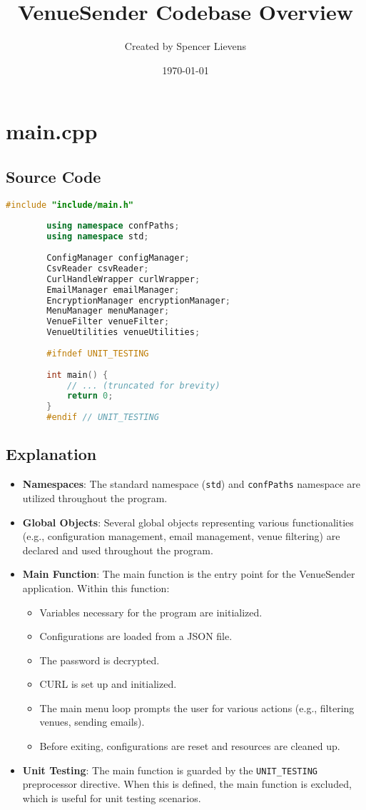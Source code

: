 \documentclass{article}
\title{VenueSender Codebase Overview}
\author{Created by Spencer Lievens}
\date{\today}
\begin{document}
	
	\maketitle
	\tableofcontents
	\newpage
	
	\section{main.cpp}
	
	\subsection*{Source Code}
	\begin{lstlisting}[language=C++]
		#include "include/main.h"
		
		using namespace confPaths;
		using namespace std;
		
		ConfigManager configManager;
		CsvReader csvReader;
		CurlHandleWrapper curlWrapper;
		EmailManager emailManager;
		EncryptionManager encryptionManager;
		MenuManager menuManager;
		VenueFilter venueFilter;
		VenueUtilities venueUtilities;
		
		#ifndef UNIT_TESTING
		
		int main() {
			// ... (truncated for brevity)
			return 0;
		}
		#endif // UNIT_TESTING
	\end{lstlisting}
	
	\subsection*{Explanation}
	\begin{itemize}
		\item \textbf{Namespaces}: The standard namespace (\texttt{std}) and \texttt{confPaths} namespace are utilized throughout the program.
		\item \textbf{Global Objects}: Several global objects representing various functionalities (e.g., configuration management, email management, venue filtering) are declared and used throughout the program.
		\item \textbf{Main Function}: The main function is the entry point for the VenueSender application. Within this function:
		\begin{itemize}
			\item Variables necessary for the program are initialized.
			\item Configurations are loaded from a JSON file.
			\item The password is decrypted.
			\item CURL is set up and initialized.
			\item The main menu loop prompts the user for various actions (e.g., filtering venues, sending emails).
			\item Before exiting, configurations are reset and resources are cleaned up.
		\end{itemize}
		\item \textbf{Unit Testing}: The main function is guarded by the \texttt{UNIT\_TESTING} preprocessor directive. When this is defined, the main function is excluded, which is useful for unit testing scenarios.
	\end{itemize}
	
\end{document}
